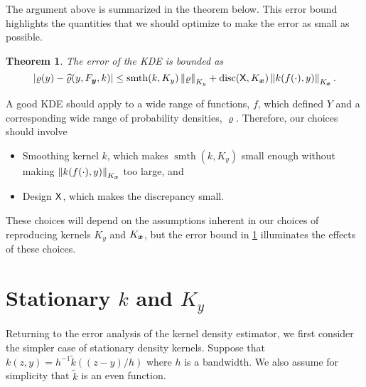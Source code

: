 \documentclass[letterpaper]{amsart}
\newtheorem{theorem}{Theorem}
\newcommand{\hvarrho}{\widehat{\varrho}}
\newcommand{\KY}{K_y}
\newcommand{\KX}{{K_{\vx}}}
\newcommand{\tk}{\tilde{k}}
\DeclareMathOperator{\smooth}{smth}
\DeclareMathOperator{\disc}{disc}
\begin{document}
The argument above is summarized in the theorem below.  This error bound highlights the quantities that we should optimize to make the error as small as possible.
\begin{theorem}\label{thm:errbd} The error of the KDE is bounded as
	\begin{equation}
			\abs{\varrho(y) - \hvarrho(y,F_{\vy},k)} \le \smooth(k,\KY) \norm[\KY]{\varrho} + \disc(\mX,\KX) \norm[\KX]{k(f(\cdot),y)}.
	\end{equation}
\end{theorem}
A good KDE should apply to a wide range of  functions, $f$, which defined $Y$ and a corresponding wide range of probability densities, $\varrho$.  Therefore, our choices should involve
\begin{itemize}
	\item  Smoothing kernel $k$, which makes $\smooth(k,\KY)$ small enough without making $\norm[\KX]{k(f(\cdot),y)}$ too large, and
	\item Design $\mathsf{X}$, which makes the discrepancy small.
\end{itemize}
These choices will depend on the assumptions inherent in our choices of reproducing kernels $\KY$ and $\KX$, but the error bound in \cref{thm:errbd} illuminates the effects of these choices.



\section{Stationary $k$ and $\KY$}

Returning to the error analysis of the kernel density estimator, we first consider the simpler case of stationary density kernels.  Suppose that $k(z,y) = h^{-1}\tk((z-y)/h)$ where $h$ is a bandwidth. We also assume for simplicity that $\tk$ is an even function.
\end{document}

